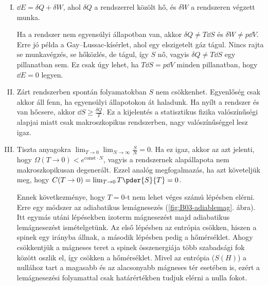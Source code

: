    \begin{enumerate}[I. főtétel:]
    \item 
     $\dd E=\delta Q+\delta W$, ahol $\delta Q$ a rendszerrel közölt hő, és $\delta W$ a rendszeren végzett munka.
    
     Ha a rendszer nem egyensúlyi állapotban van, akkor $\delta Q\ne T\dd S$ és $\delta W\ne p\dd V$.
   Erre jó példa a Gay--Lussac-kísérlet, ahol egy elszigetelt gáz tágul.
   Nincs rajta se munkavégzés, se hőközlés, de tágul, így $S$ nő, vagyis $\delta Q\ne T\dd S$ egy pillanatban sem.
   Ez csak úgy lehet, ha $T\dd S=p\dd V$ minden pillanatban, hogy $\dd E=0$ legyen.
    
    \item
     Zárt rendszerben spontán folyamatokban $S$ nem csökkenhet.
   Egyenlőség csak akkor áll fenn, ha egyensúlyi állapotokon át haladunk.
   Ha nyílt a rendszer és van hőcsere, akkor $\dd S\ge\frac{\delta Q}{T}$.
   Ez a kijelentés a statisztikus fizika valószínűségi alapjai miatt csak makroszkopikus rendszerben, nagy valószínűséggel lesz igaz.
     
    \item 
     Tiszta anyagokra $\lim_{T\to 0}\lim_{N\to\infty}\frac{S}{N}=0$.
   Ha ez igaz, akkor az azt jelenti, hogy $\Omega(T\to 0)<e^{\text{const} \cdot N}$, vagyis a rendszernek alapállapota nem makroszkopikusan degenerált.
   Ezzel analóg megfogalmazás, ha azt követeljük meg, hogy $C(T\to 0)=\lim_{T\to 0}T\pder{S}{T}=0$.
     
     Ennek következménye, hogy $T=0$-t nem lehet véges számú lépésben elérni.
   Erre egy módszer az adiabatikus lemágnesezés (\ref{fig:B03-adiablemag}. ábra).
   Itt egymás utáni lépésekben izoterm mágnesezést majd adiabatikus lemágnesezést ismételgetünk.
   Az első lépésben az entrópia csökken, hiszen a spinek egy irányba állnak, a második lépésben pedig a hőmérséklet.
   Ahogy csökkentjük a mágneses teret a spinek összenergiája több szabadsági fok között oszlik el, így csökken a hőmérséklet.
   Mivel az entrópia ($S(H)$) a nullához tart a magasabb és az alacsonyabb mágneses tér esetében is, ezért a lemágnesezési folyamattal csak határértékben tudjuk elérni a nulla fokot. 
     

\end{enumerate}
